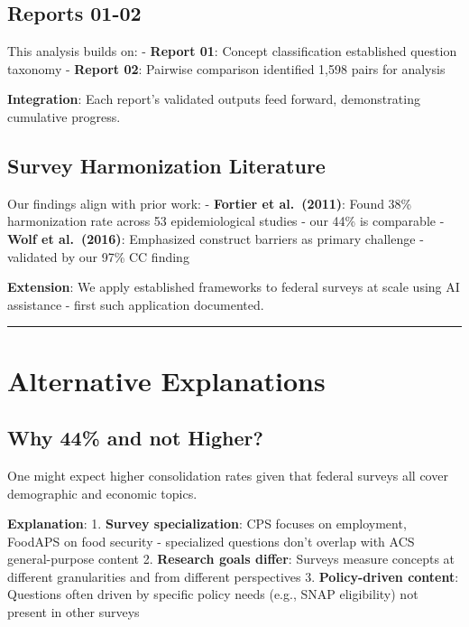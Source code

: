 \documentclass[
  letterpaper,
]{report}
\begin{document}
\subsection{Reports 01-02}\label{reports-01-02}

This analysis builds on: - \textbf{Report 01}: Concept classification
established question taxonomy - \textbf{Report 02}: Pairwise comparison
identified 1,598 pairs for analysis

\textbf{Integration}: Each report's validated outputs feed forward,
demonstrating cumulative progress.

\subsection{Survey Harmonization
Literature}\label{survey-harmonization-literature}

Our findings align with prior work: - \textbf{Fortier et al.~(2011)}:
Found 38\% harmonization rate across 53 epidemiological studies - our
44\% is comparable - \textbf{Wolf et al.~(2016)}: Emphasized construct
barriers as primary challenge - validated by our 97\% CC finding

\textbf{Extension}: We apply established frameworks to federal surveys
at scale using AI assistance - first such application documented.

\begin{center}\rule{0.5\linewidth}{0.5pt}\end{center}

\section{Alternative Explanations}\label{alternative-explanations}

\subsection{Why 44\% and not Higher?}\label{why-44-and-not-higher}

One might expect higher consolidation rates given that federal surveys
all cover demographic and economic topics.

\textbf{Explanation}: 1. \textbf{Survey specialization}: CPS focuses on
employment, FoodAPS on food security - specialized questions don't
overlap with ACS general-purpose content 2. \textbf{Research goals
differ}: Surveys measure concepts at different granularities and from
different perspectives 3. \textbf{Policy-driven content}: Questions
often driven by specific policy needs (e.g., SNAP eligibility) not
present in other surveys
\end{document}
